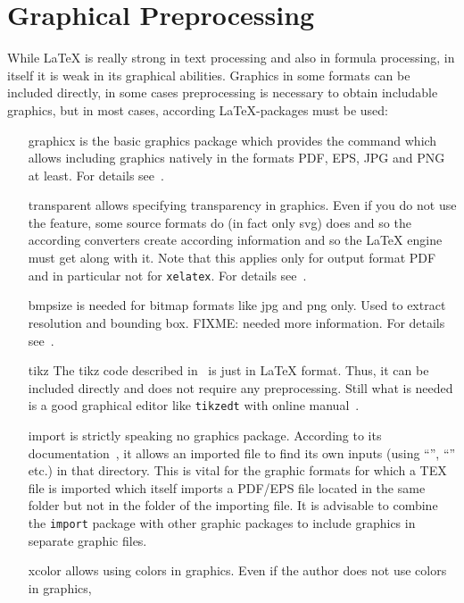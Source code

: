 \chapter{Graphical Preprocessing}\label{chap:GraphConversions}

While \LaTeX{} is really strong in text processing 
and also in formula processing, 
in itself it is weak in its graphical abilities. 
Graphics in some formats can be included directly, 
in some cases preprocessing is necessary to obtain includable graphics, 
but in most cases, according \LaTeX-packages must be used: 
%
\begin{itemize}
\item[graphicx]
is the basic graphics package which provides the command 
which allows including graphics natively 
in the formats PDF, EPS, JPG and PNG at least. 
For details see~\cite{GraX}. 
\item[transparent]
allows specifying transparency in graphics. 
Even if you do not use the feature, 
some source formats do (in fact only \gls{svg}) does 
and so the according converters create according information 
and so the \LaTeX{} engine must get along with it. 
Note that this applies only for output format PDF 
and in particular not for \texttt{xelatex}. 
For details see~\cite{TransP}. 
\item[bmpsize]
is needed for bitmap formats like \gls{jpg} and \gls{png} only. 
Used to extract resolution and bounding box. 
FIXME\@: needed more information. 
For details see~\cite{BmpP}. 
\item[tikz]
The tikz code described in~\cite{TikzPGF23} is just in \LaTeX{} format. 
Thus, it can be included directly and does not require any preprocessing. 
Still what is needed is a good graphical editor like \texttt{tikzedt} 
with online manual~\cite{TikzEdt}. 
\item[import]
is strictly speaking no graphics package. 
According to its documentation~\cite{ImpoP}, 
it allows an imported file to find its own inputs 
(using ``'', ``'' etc.) in that directory. 
This is vital for the graphic formats for which a TEX file is imported 
which itself imports a PDF/EPS file located in the same folder 
but not in the folder of the importing file. 
It is advisable to combine the \texttt{import} package with other graphic packages 
to include graphics in separate graphic files. 
\item[xcolor]
allows using colors in graphics. 
Even if the author does not use colors in graphics, 

\end{itemize}
